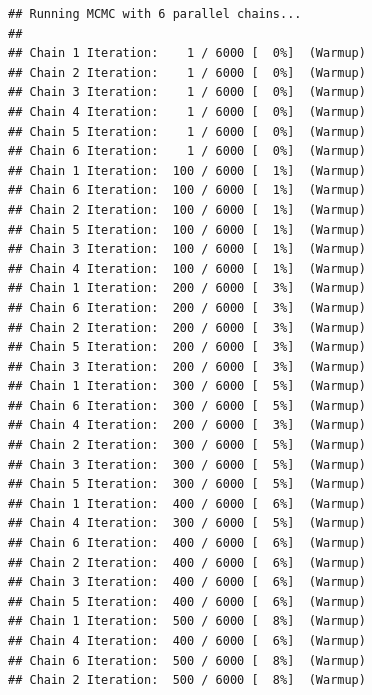 \documentclass[
]{article}
\newenvironment{Shaded}{\begin{snugshade}}{\end{snugshade}}
\newcommand{\AttributeTok}[1]{\textcolor[rgb]{0.13,0.29,0.53}{#1}}
\newcommand{\DecValTok}[1]{\textcolor[rgb]{0.00,0.00,0.81}{#1}}
\newcommand{\FunctionTok}[1]{\textcolor[rgb]{0.13,0.29,0.53}{\textbf{#1}}}
\newcommand{\NormalTok}[1]{#1}
\newcommand{\SpecialCharTok}[1]{\textcolor[rgb]{0.81,0.36,0.00}{\textbf{#1}}}
\begin{document}
\begin{Shaded}
\end{Shaded}

\begin{verbatim}
## Running MCMC with 6 parallel chains...
## 
## Chain 1 Iteration:    1 / 6000 [  0%]  (Warmup) 
## Chain 2 Iteration:    1 / 6000 [  0%]  (Warmup) 
## Chain 3 Iteration:    1 / 6000 [  0%]  (Warmup) 
## Chain 4 Iteration:    1 / 6000 [  0%]  (Warmup) 
## Chain 5 Iteration:    1 / 6000 [  0%]  (Warmup) 
## Chain 6 Iteration:    1 / 6000 [  0%]  (Warmup) 
## Chain 1 Iteration:  100 / 6000 [  1%]  (Warmup) 
## Chain 6 Iteration:  100 / 6000 [  1%]  (Warmup) 
## Chain 2 Iteration:  100 / 6000 [  1%]  (Warmup) 
## Chain 5 Iteration:  100 / 6000 [  1%]  (Warmup) 
## Chain 3 Iteration:  100 / 6000 [  1%]  (Warmup) 
## Chain 4 Iteration:  100 / 6000 [  1%]  (Warmup) 
## Chain 1 Iteration:  200 / 6000 [  3%]  (Warmup) 
## Chain 6 Iteration:  200 / 6000 [  3%]  (Warmup) 
## Chain 2 Iteration:  200 / 6000 [  3%]  (Warmup) 
## Chain 5 Iteration:  200 / 6000 [  3%]  (Warmup) 
## Chain 3 Iteration:  200 / 6000 [  3%]  (Warmup) 
## Chain 1 Iteration:  300 / 6000 [  5%]  (Warmup) 
## Chain 6 Iteration:  300 / 6000 [  5%]  (Warmup) 
## Chain 4 Iteration:  200 / 6000 [  3%]  (Warmup) 
## Chain 2 Iteration:  300 / 6000 [  5%]  (Warmup) 
## Chain 3 Iteration:  300 / 6000 [  5%]  (Warmup) 
## Chain 5 Iteration:  300 / 6000 [  5%]  (Warmup) 
## Chain 1 Iteration:  400 / 6000 [  6%]  (Warmup) 
## Chain 4 Iteration:  300 / 6000 [  5%]  (Warmup) 
## Chain 6 Iteration:  400 / 6000 [  6%]  (Warmup) 
## Chain 2 Iteration:  400 / 6000 [  6%]  (Warmup) 
## Chain 3 Iteration:  400 / 6000 [  6%]  (Warmup) 
## Chain 5 Iteration:  400 / 6000 [  6%]  (Warmup) 
## Chain 1 Iteration:  500 / 6000 [  8%]  (Warmup) 
## Chain 4 Iteration:  400 / 6000 [  6%]  (Warmup) 
## Chain 6 Iteration:  500 / 6000 [  8%]  (Warmup) 
## Chain 2 Iteration:  500 / 6000 [  8%]  (Warmup) 

\end{verbatim}
\end{document}
